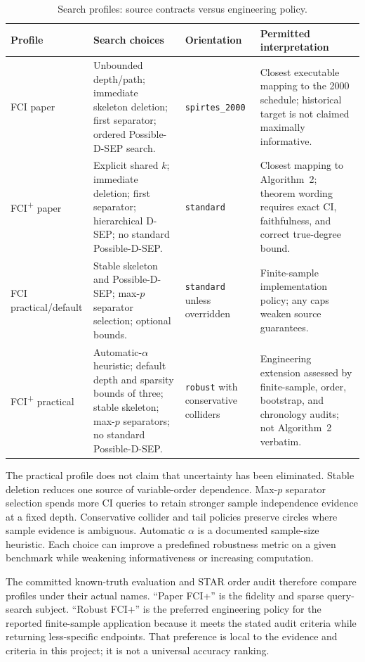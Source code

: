 \documentclass[11pt,a4paper,oneside]{report}
\newcommand{\FCIplus}{FCI\textsuperscript{+}}
\newcommand{\code}[1]{\texttt{#1}}
\begin{document}
\begin{table}[H]
\centering
\caption{Search profiles: source contracts versus engineering policy.}
\label{tab:profile-contracts}
\begin{tabularx}{\textwidth}{p{}p{}YY}
\toprule
Profile & Search choices & Orientation & Permitted interpretation \\
\midrule
FCI paper &
Unbounded depth/path; immediate skeleton deletion; first separator; ordered
Possible-D-SEP search. &
\code{spirtes\_2000} &
Closest executable mapping to the 2000 schedule; historical target is not
claimed maximally informative. \\
\FCIplus{} paper &
Explicit shared \(k\); immediate deletion; first separator; hierarchical
D-SEP; no standard Possible-D-SEP. &
\code{standard} &
Closest mapping to Algorithm~2; theorem wording requires exact CI,
faithfulness, and correct true-degree bound. \\
FCI practical/default &
Stable skeleton and Possible-D-SEP; max-\(p\) separator selection; optional
bounds. &
\code{standard} unless overridden &
Finite-sample implementation policy; any caps weaken source guarantees. \\
\FCIplus{} practical &
Automatic-\(\alpha\) heuristic; default depth and sparsity bounds of three;
stable skeleton; max-\(p\) separators; no standard Possible-D-SEP. &
\code{robust} with conservative colliders &
Engineering extension assessed by finite-sample, order, bootstrap, and
chronology audits; not Algorithm~2 verbatim. \\
\bottomrule
\end{tabularx}
\end{table}

The practical profile does not claim that uncertainty has been eliminated.
Stable deletion reduces one source of variable-order dependence.  Max-\(p\)
separator selection spends more CI queries to retain stronger sample
independence evidence at a fixed depth.  Conservative collider and tail
policies preserve circles where sample evidence is ambiguous.  Automatic
\(\alpha\) is a documented sample-size heuristic.  Each choice can improve a
predefined robustness metric on a given benchmark while weakening
informativeness or increasing computation.

The committed known-truth evaluation and STAR order audit therefore compare
profiles under their actual names.  ``Paper FCI+'' is the fidelity and sparse
query-search subject.  ``Robust FCI+'' is the preferred engineering policy for
the reported finite-sample application because it meets the stated audit
criteria while returning less-specific endpoints.  That preference is local
to the evidence and criteria in this project; it is not a universal accuracy
ranking.
\end{document}
